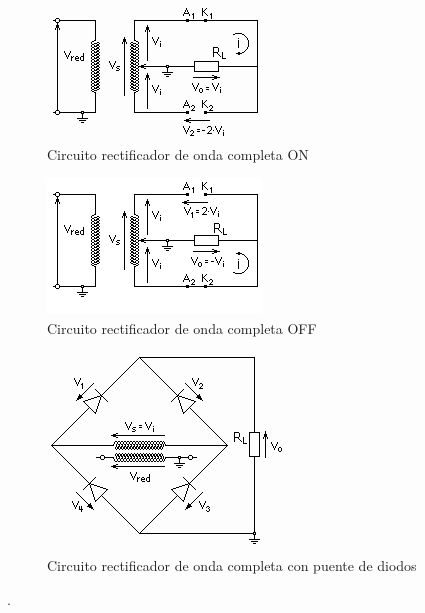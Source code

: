 \documentclass[a4paper,12pt]{article}
\begin{document}
\begin{figure}
  \begin{center}
    \includegraphics{images/Circuito_rectificador_onda_completa_ON.png}
    \caption{Circuito rectificador de onda completa ON}
    \label{Figura2}
  \end{center}
\end{figure}

\begin{figure}
  \begin{center}
    \includegraphics{images/Circuito_rectificador_onda_completa_OFF.png}
    \caption{Circuito rectificador de onda completa OFF}
    \label{Figura3}
  \end{center}
\end{figure}

\begin{figure}
  \begin{center}
    \includegraphics{images/Puente_de_diodos.png}
    \caption{Circuito rectificador de onda completa con puente de diodos}
    \label{Figura4}
  \end{center}
\end{figure}

.\\
\end{document}
